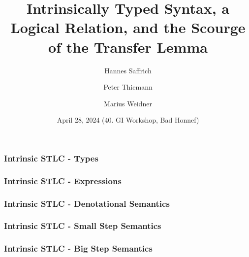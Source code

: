 \documentclass[dvipsnames,aspectratio=169,pdftex]{beamer}
\title{Intrinsically Typed Syntax, a Logical Relation, and the Scourge of the Transfer Lemma}
\author[Saffrich, Thiemann, Weidner]
{
Hannes Saffrich \and Peter Thiemann \and
{Marius Weidner} 
}
\institute{University of Freiburg
}
\date{April 28, 2024 (40. GI Workshop, Bad Honnef)}
\begin{document}
\begin{frame}{\null}
  \titlepage 
\end{frame}

\begin{frame}
  \frametitle{Intrinsic STLC - Types}
  \STLCType
\end{frame}

\begin{frame}
  \frametitle{Intrinsic STLC - Expressions}
\end{frame}

\begin{frame}
  \frametitle{Intrinsic STLC - Denotational Semantics}
\end{frame}

\begin{frame}
  \frametitle{Intrinsic STLC - Small Step Semantics}
\end{frame}

\begin{frame}
  \frametitle{Intrinsic STLC - Big Step Semantics}
\end{frame}

\end{document}
